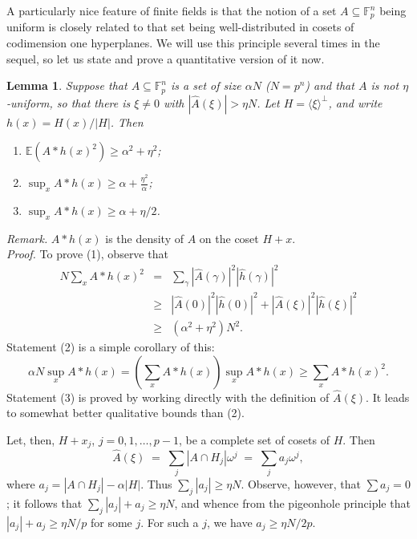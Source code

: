 \documentclass[12pt,a4paper,reqno]{amsart}
\numberwithin{equation}{section}
\theoremstyle{plain}
\newtheorem{lemma}[subsection]{Lemma}
\theoremstyle{definition}
\renewcommand{\geq}{\geqslant}
\def\proof{\noindent\textit{Proof. }}
\def\endproof{\hfill{\usebox{\proofbox}}}
\begin{document}
\noindent A particularly nice feature of finite fields is that the notion of a set $A \subseteq \mathbb{F}_p^n$ being uniform is closely related to that set being well-distributed in cosets of codimension one hyperplanes. We will use this principle several times in the sequel, so let us state and prove a quantitative version of it now.

\begin{lemma}\label{uniformity-hyperplanes}
Suppose that $A \subseteq \mathbb{F}_p^n$ is a set of size $\alpha N$ \textup{(}$N = p^n$\textup{)} and that $A$ is not $\eta$-uniform, so that there is $\xi \neq 0$ with $|\widehat{A}(\xi)| > \eta N$. Let $H = \langle \xi \rangle^{\perp}$, and write $h(x) = H(x)/|H|$. Then
\begin{enumerate}
\item $\mathbb{E}(A \ast h(x)^2) \geq \alpha^2 + \eta^2$;
\item $\sup_x A \ast h(x) \geq \alpha + \frac{\eta^2}{\alpha}$;
\item $\sup_x A \ast h(x) \geq \alpha + \eta/2 $.
\end{enumerate}
\end{lemma}
\noindent\textit{Remark.} $A \ast h(x)$ is the density of $A$ on the coset $H + x$.\\
\proof To prove (1), observe that 
\begin{eqnarray*} N\sum_x A \ast h(x)^2 & = &  \sum_{\gamma} |\widehat{A}(\gamma)|^2 |\widehat{h}(\gamma)|^2 \\ & \geq & |\widehat{A}(0)|^2 |\widehat{h}(0)|^2 + |\widehat{A}(\xi)|^2 |\widehat{h}(\xi)|^2 \\& \geq & (\alpha^2 + \eta^2)N^2.\end{eqnarray*}
Statement (2) is a simple corollary of this:
\[ \alpha N \sup_x A \ast h(x) = \left(\sum_x A \ast h(x)\right) \sup_x A\ast h(x) \geq \sum_x A\ast h(x)^2.\]
Statement (3) is proved by working directly with the definition of $\widehat{A}(\xi)$. It leads to somewhat better qualitative bounds than (2).\vspace{11pt}

\noindent Let, then,  $H + x_j$, $j = 0,1,\dots,p-1$, be a complete set of cosets of $H$. Then \[
\widehat{A}(\xi) \; = \; \sum_j|A \cap H_j|\omega^j  \; = \; \sum_j a_j\omega^j,\] where $a_j = |A \cap H_j| - \alpha |H|$. Thus $\sum_j |a_j| \geq \eta N$. Observe, however, that $\sum a_j = 0$; it follows that $\sum_j |a_j| + a_j \geq \eta N$, and whence from the pigeonhole principle that $|a_j| + a_j \geq \eta N/p$ for some $j$. For such a $j$, we have $a_j \geq \eta N/2p$.\endproof\vspace{11pt}
\end{document}
